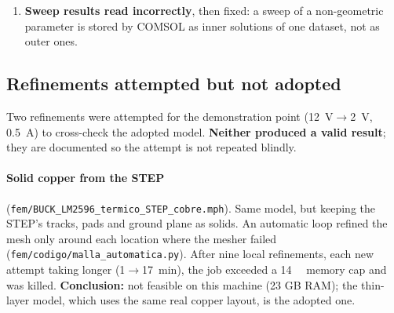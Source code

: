 \documentclass[11pt,letterpaper]{article}
\begin{document}
\begin{enumerate}[nosep]
    the board behaved as bare FR4. Detected because the bottom ground plane ranged
    \SIrange{25}{253}{\celsius} (a solid copper plane must be nearly isothermal). The results from that
    run (U1 \SI{154.6}{\celsius}, D1 \SI{319.6}{\celsius} at \SI{35}{\volt}/\SI{3}{\ampere}) are
    \textbf{invalid}. Fix: dimensionless arguments in mm; verified that the map is 1 in the middle of the
    ground plane and that the plane is now nearly isothermal. All numbers in this report come from the
    corrected model.
    \item \textbf{Sweep results read incorrectly}, then fixed: a sweep of a non-geometric parameter is
    stored by COMSOL as inner solutions of one dataset, not as outer ones.
\end{enumerate}

\subsection{Refinements attempted but not adopted}
\label{sec:attempts}

Two refinements were attempted for the demonstration point (\SI{12}{\volt}$\to$\SI{2}{\volt},
\SI{0.5}{\ampere}) to cross-check the adopted model. \textbf{Neither produced a valid result}; they are
documented so the attempt is not repeated blindly.

\paragraph{Solid copper from the STEP} (\nolinkurl{fem/BUCK_LM2596_termico_STEP_cobre.mph}). Same model,
but keeping the STEP's tracks, pads and ground plane as solids. An automatic loop refined the mesh only
around each location where the mesher failed (\nolinkurl{fem/codigo/malla_automatica.py}). After nine local
refinements, each new attempt taking longer (\SI{1}{}$\to$\SI{17}{\minute}), the job exceeded a
\SI{14}{\giga\byte} memory cap and was killed. \textbf{Conclusion:} not feasible on this machine (23 GB
RAM); the thin-layer model, which uses the same real copper layout, is the adopted one.
\end{document}
